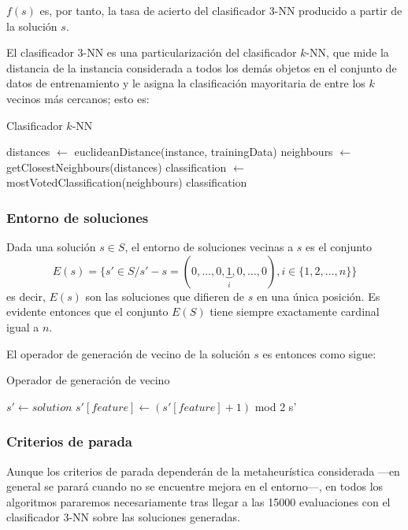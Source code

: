 \documentclass[a4paper, 11pt, titlepage]{article}
\begin{document}
    $f(s)$ es, por tanto, la tasa de acierto del clasificador 3-NN producido a partir de la solución $s$.

    El clasificador 3-NN es una particularización del clasificador $k$-NN, que mide la distancia de la instancia considerada a todos los demás objetos en el conjunto de datos de entrenamiento y le asigna la clasificación mayoritaria de entre los $k$ vecinos más cercanos; esto es:

    \begin{algorithm}
        \caption{Clasificador $k$-NN}\label{knn}
        \begin{algorithmic}[1]
            \State distances $\gets$ euclideanDistance(instance, trainingData)
            \State neighbours $\gets$ getClosestNeighbours(distances)
            \State classification $\gets$ mostVotedClassification(neighbours)
            \State \Return classification
            \EndFunction
        \end{algorithmic}
    \end{algorithm}

    \subsubsection*{Entorno de soluciones}
    Dada una solución $s \in S$, el entorno de soluciones vecinas a $s$ es el conjunto
    \[
    E(s) = \{s' \in S / s' - s = (0, \dots, 0, \underbrace{1}_i, 0, \dots, 0), i\in\{1,2, \dots, n\}\}
    \]
    es decir, $E(s)$ son las soluciones que difieren de $s$ en una única posición. Es evidente entonces que el conjunto $E(S)$ tiene siempre exactamente cardinal igual a $n$.

    El operador de generación de vecino de la solución $s$ es entonces como sigue:
    \begin{algorithm}
        \caption{Operador de generación de vecino}\label{flip}
        \begin{algorithmic}[1]
            \State $s' \gets solution$
            \State $s'[feature] \gets (s'[feature] + 1)$ mod 2
            \State \Return s'
            \EndFunction
        \end{algorithmic}
    \end{algorithm}



    \subsubsection*{Criterios de parada}
    Aunque los criterios de parada dependerán de la metaheurística considerada ---en general se parará cuando no se encuentre mejora en el entorno---, en todos los algoritmos pararemos necesariamente tras llegar a las 15000 evaluaciones con el clasificador 3-NN sobre las soluciones generadas.
\end{document}

